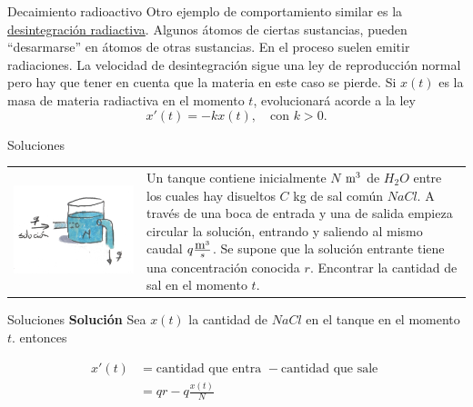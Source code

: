 \documentclass[handout,hyperref={colorlinks=true}]{beamer}
\newcommand{\nl}{\onslide<+-> }
\begin{document}
\begin{frame}{Decaimiento radioactivo}
\nl  Otro ejemplo de comportamiento similar es la \href{http://es.wikipedia.org/wiki/Radiactividad}{desintegración radiactiva}. Algunos átomos de
ciertas sustancias, pueden ``desarmarse'' en átomos de otras sustancias. En el proceso suelen emitir radiaciones.  La velocidad de desintegración sigue una ley
de reproducción normal pero hay que tener en cuenta que la materia en este caso se pierde. Si $x(t)$ es la masa de materia radiactiva en el momento $t$, evolucionará 
acorde a la ley
\[\boxed{x'(t)=-kx(t),\quad\text{con } k>0.}\]

\end{frame}

\begin{frame}{Soluciones}
\begin{tabular}{m{5cm} m{4.5cm}}
 \includegraphics[scale=.1]{imagenes/tanque.jpg} & Un tanque contiene inicialmente $N$ $\hbox{m}^3$ de $H_2O$ entre los cuales hay disueltos $C$ kg de sal común
 $NaCl$. A través de una boca de entrada y una de salida empieza circular la solución, entrando y saliendo al mismo caudal $q\frac{\hbox{m}^3}{s}$. Se supone que 
 la solución entrante tiene una concentración conocida $r$. Encontrar la cantidad de sal en el momento $t$. \\
\end{tabular}


\end{frame}


\begin{frame}{Soluciones}
\textbf{Solución} Sea $x(t)$ la cantidad de $NaCl$ en el tanque en el momento $t$. entonces

\[\begin{split}
   x'(t)&=\text{cantidad que entra }-\text{cantidad que sale }\\
          &=qr-q\frac{x(t)}{N}
  \end{split}
\]


\end{frame}
\end{document}
